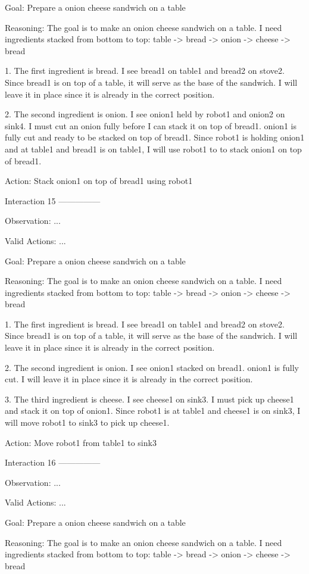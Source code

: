 Goal: Prepare a onion cheese sandwich on a table


Reasoning: The goal is to make an onion cheese sandwich on a table. I need ingredients stacked from bottom to top: table -> bread -> onion -> cheese -> bread

1. The first ingredient is bread. I see bread1 on table1 and bread2 on stove2. Since bread1 is on top of a table, it will serve as the base of the sandwich. I will leave it in place since it is already in the correct position.

2. The second ingredient is onion. I see onion1 held by robot1 and onion2 on sink4. I must cut an onion fully before I can stack it on top of bread1. onion1 is fully cut and ready to be stacked on top of bread1. Since robot1 is holding onion1 and at table1 and bread1 is on table1, I will use robot1 to to stack onion1 on top of bread1.

Action: Stack onion1 on top of bread1 using robot1


Interaction 15
---------------


Observation:
...

Valid Actions:
...

Goal: Prepare a onion cheese sandwich on a table


Reasoning: The goal is to make an onion cheese sandwich on a table. I need ingredients stacked from bottom to top: table -> bread -> onion -> cheese -> bread

1. The first ingredient is bread. I see bread1 on table1 and bread2 on stove2. Since bread1 is on top of a table, it will serve as the base of the sandwich. I will leave it in place since it is already in the correct position.

2. The second ingredient is onion. I see onion1 stacked on bread1. onion1 is fully cut. I will leave it in place since it is already in the correct position.

3. The third ingredient is cheese. I see cheese1 on sink3. I must pick up cheese1 and stack it on top of onion1. Since robot1 is at table1 and cheese1 is on sink3, I will move robot1 to sink3 to pick up cheese1.

Action: Move robot1 from table1 to sink3


Interaction 16
---------------


Observation:
...

Valid Actions:
...

Goal: Prepare a onion cheese sandwich on a table


Reasoning: The goal is to make an onion cheese sandwich on a table. I need ingredients stacked from bottom to top: table -> bread -> onion -> cheese -> bread

